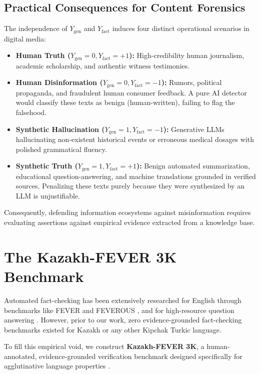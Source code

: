 \subsection{Practical Consequences for Content Forensics}
The independence of $Y_{\text{gen}}$ and $Y_{\text{fact}}$ induces four distinct operational scenarios in digital media:
\begin{itemize}
    \item \textbf{Human Truth ($Y_{\text{gen}}=0, Y_{\text{fact}}=+1$):} High-credibility human journalism, academic scholarship, and authentic witness testimonies.
    \item \textbf{Human Disinformation ($Y_{\text{gen}}=0, Y_{\text{fact}}=-1$):} Rumors, political propaganda, and fraudulent human consumer feedback. A pure AI detector would classify these texts as benign (human-written), failing to flag the falsehood.
    \item \textbf{Synthetic Hallucination ($Y_{\text{gen}}=1, Y_{\text{fact}}=-1$):} Generative LLMs hallucinating non-existent historical events or erroneous medical dosages with polished grammatical fluency.
    \item \textbf{Synthetic Truth ($Y_{\text{gen}}=1, Y_{\text{fact}}=+1$):} Benign automated summarization, educational question-answering, and machine translations grounded in verified sources. Penalizing these texts purely because they were synthesized by an LLM is unjustifiable.
\end{itemize}
Consequently, defending information ecosystems against misinformation requires evaluating assertions against empirical evidence extracted from a knowledge base.

\section{The Kazakh-FEVER 3K Benchmark}
\label{sec:fever_benchmark}

Automated fact-checking has been extensively researched for English through benchmarks like FEVER \citep{thorne2018fever} and FEVEROUS \citep{aly2021feverous}, and for high-resource question answering \citep{clark2020tydi}. However, prior to our work, zero evidence-grounded fact-checking benchmarks existed for Kazakh or any other Kipchak Turkic language.

To fill this empirical void, we construct \textbf{Kazakh-FEVER 3K}, a human-annotated, evidence-grounded verification benchmark designed specifically for agglutinative language properties \citep{anekesh2026kazakhfever}.

